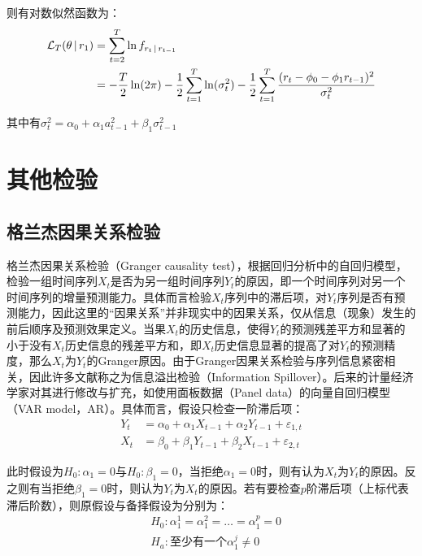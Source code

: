 \documentclass[11pt]{article}
\begin{document}
则有对数似然函数为：
\begin{align*}
    \mathcal{L}_T(\theta \,\vert\, r_1) &= \sum_{t=2}^{T} \ln f_{r_{t} \,\vert\, r_{t-1}} \\
    &= -\frac{T}{2}\ln(2\pi) - \frac{1}{2} \sum_{t=1}^{T} \ln(\sigma_{t}^{2}) - \frac{1}{2} \sum_{t=1}^{T} \frac{(r_{t} - \phi_0 -\phi_1 r_{t-1})^2}{\sigma_{t}^{2}}
\end{align*}

其中有$\sigma_t^2 = \alpha_0 + \alpha_1 a_{t-1}^{2} + \beta_1 \sigma_{t-1}^{2}$

\section{其他检验}

\subsection{格兰杰因果关系检验}

格兰杰因果关系检验（Granger causality test），根据回归分析中的自回归模型，检验一组时间序列${X_t}$是否为另一组时间序列${Y_t}$的原因，即一个时间序列对另一个时间序列的增量预测能力。具体而言检验${X_t}$序列中的滞后项，对${Y_t}$序列是否有预测能力，因此这里的“因果关系”并非现实中的因果关系，仅从信息（现象）发生的前后顺序及预测效果定义。当果${X_t}$的历史信息，使得${Y_t}$的预测残差平方和显著的小于没有${X_t}$历史信息的残差平方和，即${X_t}$历史信息显著的提高了对${Y_t}$的预测精度，那么${X_t}$为${Y_t}$的Granger原因。由于Granger因果关系检验与序列信息紧密相关，因此许多文献称之为信息溢出检验（Information Spillover）。后来的计量经济学家对其进行修改与扩充，如使用面板数据（Panel data）的向量自回归模型（VAR model，AR）。具体而言，假设只检查一阶滞后项：
\begin{align*}
    Y_t &= \alpha_0 + \alpha_1 X_{t-1} + \alpha_2 Y_{t-1} + \varepsilon_{1,t} \\
    X_t &= \beta_0 + \beta_1 Y_{t-1} + \beta_2 X_{t-1} + \varepsilon_{2,t}
\end{align*}

此时假设为$H_0: \alpha_1=0$与$H_0: \beta_1=0$，当拒绝$\alpha_1=0$时，则有认为${X_t}$为${Y_t}$的原因。反之则有当拒绝$\beta_1=0$时，则认为${Y_t}$为${X_t}$的原因。若有要检查$p$阶滞后项（上标代表滞后阶数），则原假设与备择假设为分别为：
\begin{align*}
    &H_0: \alpha_{1}^{1} = \alpha_{1}^{2} = \dots = \alpha_{1}^{p} = 0 \\
    &H_a: \text{至少有一个}\alpha_{1}^{j} \neq 0
\end{align*}
\end{document}
